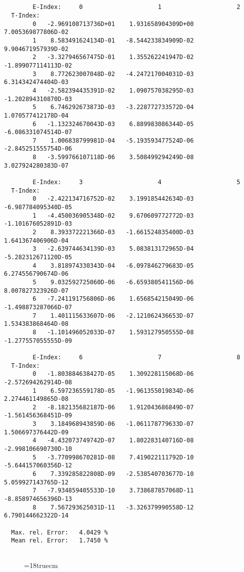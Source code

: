 \begin{verbatim}


        E-Index:     0                     1                     2
  T-Index:
        0   -2.969108713736D+01    1.931658904309D+00    7.005369877806D-02
        1    8.583491624134D-01   -8.544233834909D-02    9.904671957939D-02
        2   -3.327946567475D-01    1.355262241947D-02   -1.899077114113D-02
        3    8.772623007048D-02   -4.247217004031D-03    6.314342474404D-03
        4   -2.582394435391D-02    1.090757038295D-03   -1.202894310870D-03
        5    6.746292673873D-03   -3.228772733572D-04    1.070577412178D-04
        6   -1.132324670043D-03    6.889983086344D-05   -6.086331074514D-07
        7    1.006838799981D-04   -5.193593477524D-06   -2.845251555754D-06
        8   -3.599766107118D-06    3.508499294249D-08    3.027924280383D-07

        E-Index:     3                     4                     5
  T-Index:
        0   -2.422134716752D-02    3.199185442634D-03   -6.987784095340D-05
        1   -4.450036905348D-02    9.670609772772D-03   -1.101676052891D-03
        2    8.393372221366D-03   -1.661524835400D-03    1.641367406906D-04
        3   -2.639744634139D-03    5.083813172965D-04   -5.282312671120D-05
        4    3.818974330343D-04   -6.097846279683D-05    6.274556790674D-06
        5    9.032592725060D-06   -6.659380541156D-06    8.007827323926D-07
        6   -7.241191756806D-06    1.656854215049D-06   -1.498873287066D-07
        7    1.401115633607D-06   -2.121062436653D-07    1.534383868464D-08
        8   -1.101496052033D-07    1.593127950555D-08   -1.277557055555D-09

        E-Index:     6                     7                     8
  T-Index:
        0   -1.803884638427D-05    1.309228115068D-06   -2.572694262914D-08
        1    6.597236559178D-05   -1.961355019834D-06    2.274461149865D-08
        2   -8.182135682187D-06    1.912043686849D-07   -1.561456368451D-09
        3    3.184968943859D-06   -1.061178779633D-07    1.506697376442D-09
        4   -4.432073749742D-07    1.802283140716D-08   -2.998106690730D-10
        5   -3.770998670281D-08    7.419022111792D-10   -5.644157060356D-12
        6    7.339285822808D-09   -2.538540703677D-10    5.059927143765D-12
        7   -7.934859405533D-10    3.738687857068D-11   -8.858974656396D-13
        8    7.567293625031D-11   -3.326379990558D-12    6.790144662322D-14

  Max. rel. Error:   4.0429 %
  Mean rel. Error:   1.7450 %


\end{verbatim}
\begin{figure} \label{7.2c}
\epsfxsize=18truecm
\end{figure}
\newpage

